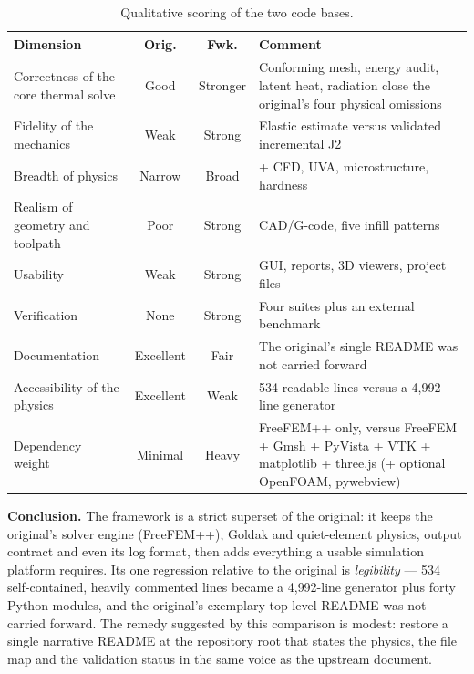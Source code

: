 \documentclass[10pt,a4paper]{article}
\begin{document}
\begin{table}[h!]
\centering
\caption{Qualitative scoring of the two code bases.}
\label{tab:verdict}
\small
\begin{tabularx}{\linewidth}{@{}l c c X@{}}
\toprule
\textbf{Dimension} & \textbf{Orig.} & \textbf{Fwk.} & \textbf{Comment} \\
\midrule
Correctness of the core thermal solve & Good & Stronger &
Conforming mesh, energy audit, latent heat, radiation close the original's four
physical omissions \\
\addlinespace
Fidelity of the mechanics & Weak & Strong & Elastic estimate versus validated
incremental J2 \\
\addlinespace
Breadth of physics & Narrow & Broad & + CFD, UVA, microstructure, hardness \\
\addlinespace
Realism of geometry and toolpath & Poor & Strong & CAD/G-code, five infill
patterns \\
\addlinespace
Usability & Weak & Strong & GUI, reports, 3D viewers, project files \\
\addlinespace
Verification & None & Strong & Four suites plus an external benchmark \\
\addlinespace
Documentation & Excellent & Fair & The original's single README was not
carried forward \\
\addlinespace
Accessibility of the physics & Excellent & Weak & 534 readable lines versus a
4{,}992-line generator \\
\addlinespace
Dependency weight & Minimal & Heavy & FreeFEM++ only, versus FreeFEM + Gmsh +
PyVista + VTK + matplotlib + three.js (+ optional OpenFOAM, pywebview) \\
\bottomrule
\end{tabularx}
\end{table}

\noindent\textbf{Conclusion.} The framework is a strict superset of the
original: it keeps the original's solver engine (FreeFEM++), Goldak and
quiet-element physics, output contract and even its log format, then adds
everything a usable simulation platform requires. Its one regression relative
to the original is \emph{legibility} --- 534 self-contained, heavily commented
lines became a 4{,}992-line generator plus forty Python modules, and the
original's exemplary top-level README was not carried forward. The remedy
suggested by this comparison is modest: restore a single narrative README at
the repository root that states the physics, the file map and the validation
status in the same voice as the upstream document.
\end{document}
